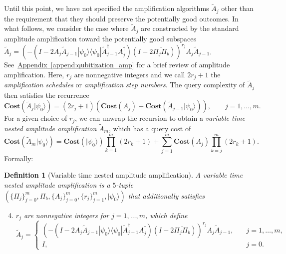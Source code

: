 \documentclass[letterpaper,onecolumn,11pt,accepted=2026-02-14]{quantumarticle}
\newtheorem{definition}[lemma]{Definition}
\theoremstyle{remark}
\theoremstyle{plain}
\newcommand{\append}[1]{\hyperref[append:#1]{Appendix~\ref*{append:#1}}}
\newcommand{\ket}[1]{|#1\rangle}
\newcommand{\bra}[1]{\langle#1|}
\newcommand{\ketbra}[2]{\ket{#1}\!\bra{#2}}
\begin{document}
Until this point, we have not specified the amplification algorithms $\widetilde A_j$ other than the requirement that they should preserve the potentially good outcomes. In what follows, we consider the case where $\widetilde A_j$ are constructed by the standard amplitude amplification toward the potentially good subspaces $\widetilde A_j
    =\left(-\left(I-2A_j\widetilde A_{j-1}\ketbra{\psi_0}{\psi_0}\widetilde A_{j-1}^\dagger A_j^\dagger\right)\left(I-2\overline{\Pi_j\Pi_b}\right)\right)^{r_j}A_j\widetilde A_{j-1}$.
See~\append{qubitization_amp} for a brief review of amplitude amplification.
Here, $r_j$ are nonnegative integers and we call $2r_j+1$ the \emph{amplification schedules} or \emph{amplification step numbers}. The query complexity of $\widetilde A_j$ then satisfies the recurrence
\begin{equation}
    \mathbf{Cost}\left(\widetilde A_j\ket{\psi_0}\right)=(2r_j+1)\left(\mathbf{Cost}( A_j)+\mathbf{Cost}\left(\widetilde A_{j-1}\ket{\psi_0}\right)\right),\qquad
    j=1,\ldots,m.
\end{equation}
For a given choice of $r_j$, we can unwrap the recursion to obtain a \emph{variable time nested amplitude amplification} $\widetilde A_m$, which has a query cost of
\begin{equation}
\label{eq:nest_complexity}
    \mathbf{Cost}\left(\widetilde A_m\ket{\psi_0}\right)
    =\mathbf{Cost}(\ket{\psi_0})\prod_{k=1}^m(2r_k+1)
    +\sum_{j=1}^m\mathbf{Cost}(A_j)\prod_{k=j}^m(2r_k+1).
\end{equation}
Formally:
\begin{definition}[Variable time nested amplitude amplification]
\label{defn:nested}
A variable time nested amplitude amplification is a $5$-tuple $\left(\{\Pi_j\}_{j=0}^m,\Pi_b,\{A_j\}_{j=0}^m,\{r_j\}_{j=1}^m,\ket{\psi_0}\right)$ that additionally satisfies
\begin{enumerate}[label=(\roman*$'$)]
\setcounter{enumi}{3}
    \item \label{enum:nested_amp} $r_j$ are nonnegative integers for $j=1,\ldots,m$, which define
\begin{equation}
    \widetilde A_j=
    \begin{cases}
        \left(-\left(I-2A_j\widetilde A_{j-1}\ketbra{\psi_0}{\psi_0}\widetilde A_{j-1}^\dagger A_j^\dagger\right)\left(I-2\overline{\Pi_j\Pi_b}\right)\right)^{r_j}A_j\widetilde A_{j-1},\quad&j=1,\ldots,m,\\
        I,&j=0.
    \end{cases}
\end{equation}
\end{enumerate}
\end{definition}
\end{document}
